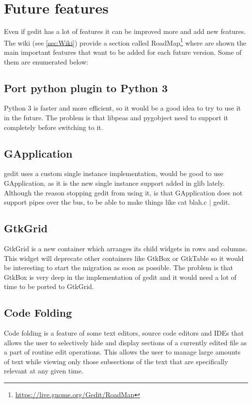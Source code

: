 
\chapter{Future features}

Even if gedit has a lot of features it can be improved more and add new features. The wiki (see \ref{sec:Wiki}) provide a section called RoadMap\footnote{\url{https://live.gnome.org/Gedit/RoadMap}} where are shown the main important features that want to be added for each future version. Some of them are enumerated below:

\section{Port python plugin to Python 3}

Python 3 is faster and more efficient, so it would be a good idea to try to use it in the future. The problem is that libpeas and pygobject need to support it completely before switching to it.

\section{GApplication}

gedit uses a custom single instance implementation, would be good to use GApplication, as it is the new single instance support added in glib lately. Although the reason stopping gedit from using it, is that GApplication does not support pipes over the bus, to be able to make things like cat blah.c | gedit.

\section{GtkGrid}

GtkGrid is a new container which arranges its child widgets in rows and columns. This widget will deprecate other containers like GtkBox or GtkTable so it would be interesting to start the migration as soon as possible. The problem is that GtkBox is very deep in the implementation of gedit and it would need a lot of time to be ported to GtkGrid.

\section{Code Folding}

Code folding is a feature of some text editors, source code editors and IDEs that allows the user to selectively hide and display sections of a currently edited file as a part of routine edit operations. This allows the user to manage large amounts of text while viewing only those subsections of the text that are specifically relevant at any given time.\cite{website:code-folding}

